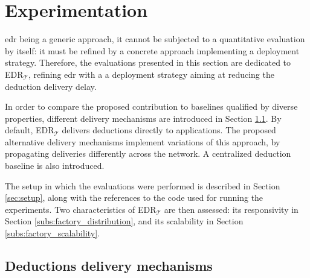 \documentclass{iosart2c}
\newcommand{\edrt}{EDR$_{\mathcal{T}}$\xspace}
\begin{document}
\section{Experimentation}
\label{sec:experimentations}
\gls{edr} being a generic approach, it cannot be subjected to a quantitative evaluation by itself: it must be refined by a concrete approach implementing a deployment strategy. 
Therefore, the evaluations presented in this section are dedicated to \edrt, refining \gls{edr} with a a deployment strategy aiming at reducing the deduction delivery delay.

In order to compare the proposed contribution to baselines qualified by diverse properties, different delivery mechanisms are introduced in Section \textsection \ref{sec:deductions_propagation_strategies}. 
By default, \edrt delivers deductions directly to applications. 
The proposed alternative delivery mechanisms implement variations of this approach, by propagating deliveries differently across the network.
A centralized deduction baseline is also introduced.

The setup in which the evaluations were performed is described in Section \textsection \ref{sec:setup}, along with the references to the code used for running the experiments.
Two characteristics of \edrt are then assessed: its responsivity in Section \textsection\ref{subs:factory_distribution}, and its scalability in Section \textsection\ref{subs:factory_scalability}.

\subsection{Deductions delivery mechanisms}
\label{sec:deductions_propagation_strategies}
\end{document}
